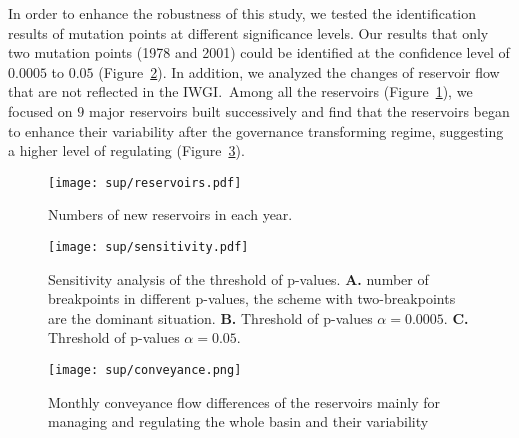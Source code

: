 In order to enhance the robustness of this study, we tested the identification results of mutation points at different significance levels.
Our results that only two mutation points (1978 and 2001) could be identified at the confidence level of $0.0005$ to $0.05$ (Figure~\ref{fig:sensitivity}).
In addition, we analyzed the changes of reservoir flow that are not reflected in the IWGI.\ Among all the reservoirs (Figure~\ref{fig:reservoirs}), we focused on $9$ major reservoirs built successively and find that the reservoirs began to enhance their variability after the governance transforming regime, suggesting a higher level of regulating (Figure~\ref{fig:conveyance}).

\begin{figure}[tb]
    \centering
    \texttt{[image: sup/reservoirs.pdf]}
    \caption{
          Numbers of new reservoirs in each year.
    }\label{fig:reservoirs}
\end{figure}

\begin{figure}
    \centering
    \texttt{[image: sup/sensitivity.pdf]}
    \caption{
          Sensitivity analysis of the threshold of p-values.
          \textbf{A.} number of breakpoints in different p-values, the scheme with two-breakpoints are the dominant situation.
          \textbf{B.} Threshold of p-values \(\alpha=0.0005\).
          \textbf{C.} Threshold of p-values \(\alpha=0.05\).
    }\label{fig:sensitivity}
\end{figure}


\begin{figure}[htb]
    \centering
    \texttt{[image: sup/conveyance.png]}
    \caption{Monthly conveyance flow differences of the reservoirs mainly for managing and regulating the whole basin and their variability}\label{fig:conveyance}
\end{figure}
